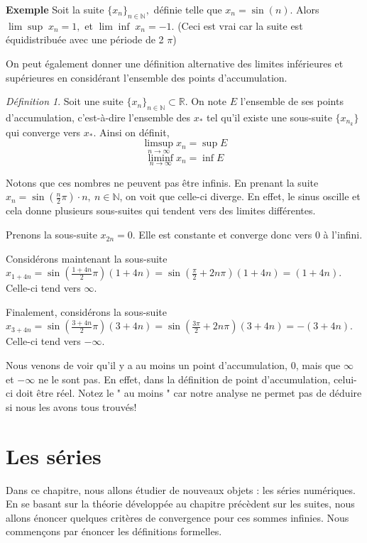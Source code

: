 \documentclass[oneside,12pt,french,table]{book}
\theoremstyle{definition}
\theoremstyle{plain}
\theoremstyle{remark}
\newtheorem{defi}[definition]{Définition}
\newcommand{\Nn}{{\mathbb{N}}}
\newcommand{\Rr}{{\mathbb{R}}}
\begin{document}
\textbf{Exemple} Soit la suite $\{x_n\}_{n\in \Nn},$ définie telle que $x_n = \sin(n).$ Alors $\lim\sup \; x_n = 1,$ et $\lim\inf \; x_n = -1.$ (Ceci est vrai car la suite est équidistribuée avec une période de 2 $\pi$)

On peut également donner une définition alternative des limites inférieures et supérieures en considérant l'ensemble des points d'accumulation. 
\begin{defi}
    Soit une suite $\{x_n\}_{n\in \Nn}\subset \Rr$. On note $E$ l'ensemble de ses points d'accumulation, c'est-à-dire l'ensemble des $x_*$ tel qu'il existe une sous-suite $\{x_{n_k}\}$ qui converge vers $x_*$. Ainsi on définit,
        \[
    \limsup_{n \rightarrow \infty} x_n = \sup E
    \]
    \[
    \liminf_{n \rightarrow \infty} x_n = \inf E
    \]
\end{defi}
 Notons que ces nombres ne peuvent pas être infinis. 
En prenant la suite $x_n=\sin(\frac{n}{2}\pi)\cdot n, ~ n\in \Nn$, on voit que celle-ci diverge. En effet, le sinus oscille et cela donne plusieurs sous-suites qui tendent vers des limites différentes.

Prenons la sous-suite $x_{2n}=0$. Elle est constante et converge donc vers 0 à l'infini.

Considérons maintenant la sous-suite $x_{1+4n}=\sin(\frac{1+4n}{2}\pi)(1+4n)=\sin(\frac{\pi}{2}+2n\pi)(1+4n)=(1+4n)$. Celle-ci tend vers $\infty$. 

Finalement, considérons la sous-suite $x_{3+4n}=\sin(\frac{3+4n}{2}\pi)(3+4n)=\sin(\frac{3\pi}{2}+2n\pi)(3+4n)=-(3+4n)$. Celle-ci tend vers $-\infty$.

Nous venons de voir qu'il y a au moins un point d'accumulation, 0, mais que $\infty$ et $-\infty$ ne le sont pas. En effet, dans la définition de point d'accumulation, celui-ci doit être réel. Notez le " au moins " car notre analyse ne permet pas de déduire si nous les avons tous trouvés! 
 
\chapter{Les séries}
Dans ce chapitre, nous allons étudier de nouveaux objets : les séries numériques. En se basant sur la théorie développée au chapitre précèdent sur les suites, nous allons énoncer quelques critères de convergence pour ces sommes infinies. Nous commençons par énoncer les définitions formelles. 
\end{document}
